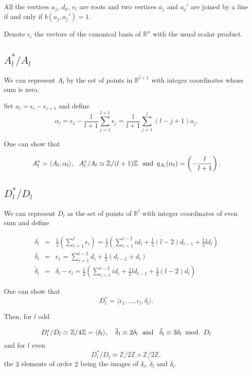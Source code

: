 \documentclass{amsart}
\begin{document}
All the vertices $a_j$, $d_k$, $e_l$ are roots and two vertices $a_j$ and $a_j'$ are joined by a line if and only if $b(a_j,a_j')=1$.





Denote $\epsilon_i$ the vectors of the canonical basis of $\mathbb R^n$ with the usual scalar product.

\subsection{{\bf{$A_l^{*}/A_l$}}}


We can represent $A_l$ by the set of points in $\mathbb R^{l+1}$ with integer coordinates whose sum is zero.

Set $a_i=\epsilon_i-\epsilon_{i+1}$ and define
$${\alpha}_l=\epsilon_1-\frac {1}{l+1} \sum_{j=1}^{l+1} \epsilon_j=\frac {1}{l+1} \sum_{j=1}^{l}(l-j+1)a_j.$$

One can show that

$$A_l^*=\langle A_l,{\alpha_l} \rangle, \,\,\,\, A_l^*/A_l  \simeq \mathbb Z /(l+1)\mathbb Z \,\,\,\,\hbox{and}\,\,\,q_{A_l}(\alpha_l)=\left( -\frac {l}{l+1} \right).$$





\subsection{{\bf{$D_l^*/D_l$}}}
We can represent $D_l$ as the set of points of $\mathbb R^l$ with integer coordinates of even sum and define


$$
\begin{array}{lll}
{\delta}_{l} & = &\frac {1}{2}(\sum_{i=1}^l \epsilon_i)=\frac {1}{2}\left( \sum_{i=1}^{l-2}id_i+\frac {1}{2}(l-2)d_{l-1}+\frac {1}{2}ld_l \right)\\[15pt]
\overline{\delta}_l & = &\epsilon_1 =\sum_{i=1}^{l-2} d_i+\frac {1}{2}(d_{l-1}+d_l)\\[15pt]
\tilde{\delta}_{l} & = & \delta_l-\epsilon_l =\frac {1}{2}\left( \sum_{i=1}^{l-2}id_i+\frac {1}{2}ld_{l-1}+\frac {1}{2}(l-2)d_l  \right)
\end{array}
$$


One can show that
$$D_l^*= \langle \epsilon_1, \ldots , \epsilon_l, \delta_l \rangle.$$

Then, for $l$ odd

$$ D_l^* /D_l \simeq \mathbb Z /4 \mathbb Z =\langle {\delta_l} \rangle, \,\, \,\,\,\, \overline{\delta}_l\equiv 2 {\delta_l}\,\,\,\,\hbox{and}\,\,\,\,\,\tilde{\delta}_{l}\equiv 3 {\delta}_l\,\,\, \hbox{mod.}\,\,\,D_l$$
and for $l$ even
$$D_l^* /D_l \simeq \mathbb Z /2 \mathbb Z \times \mathbb Z /2 \mathbb Z,$$
the $3$ elements of order $2$ being the images of ${\delta}_l$, $\tilde{\delta}_{l}$ and $\overline{\delta}_l$.
\end{document}
